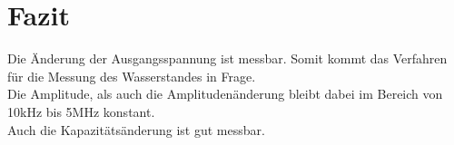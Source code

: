\documentclass[a4,paper,fleqn]{article}
\begin{document}
\section{Fazit}
Die Änderung der Ausgangsspannung ist messbar. Somit kommt das Verfahren für 
die Messung des Wasserstandes in Frage. \\
Die Amplitude, als auch die Amplitudenänderung bleibt dabei im Bereich von 
10\si{\kilo\hertz} bis 5\si{\mega\hertz} konstant. \\
Auch die Kapazitätsänderung ist gut messbar. 
\end{document}
